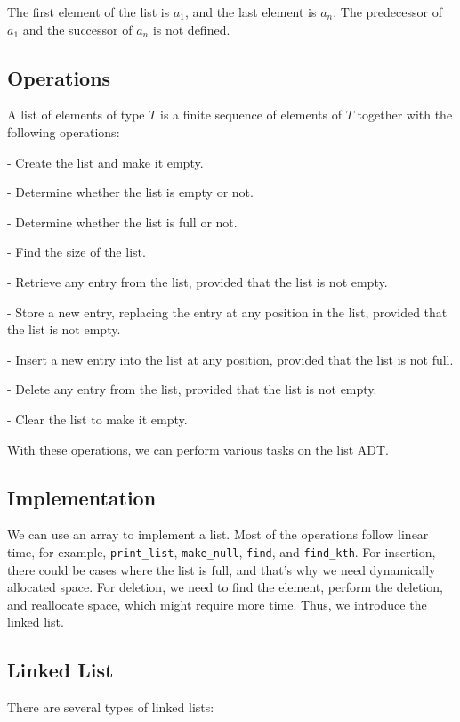 The first element of the list is \(a_1\), and the last element is \(a_n\). The predecessor of \(a_1\) and the successor of \(a_n\) is not defined. 

\subsection{Operations}
A list of elements of type \(T\) is a finite sequence of elements of \(T\) together with the following operations:

- Create the list and make it empty.

- Determine whether the list is empty or not.

- Determine whether the list is full or not.

- Find the size of the list.

- Retrieve any entry from the list, provided that the list is not empty.

- Store a new entry, replacing the entry at any position in the list, provided that the list is not empty.

- Insert a new entry into the list at any position, provided that the list is not full.

- Delete any entry from the list, provided that the list is not empty.

- Clear the list to make it empty.

With these operations, we can perform various tasks on the list ADT.

\subsection{Implementation}
We can use an array to implement a list. Most of the operations follow linear time, for example, \verb|print_list|, \verb|make_null|, \verb|find|, and \verb|find_kth|. For insertion, there could be cases where the list is full, and that's why we need dynamically allocated space. For deletion, we need to find the element, perform the deletion, and reallocate space, which might require more time. Thus, we introduce the linked list.

\subsection{Linked List}
There are several types of linked lists:

